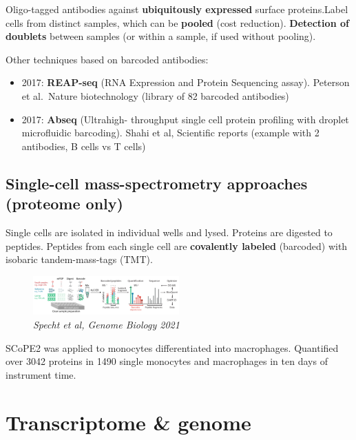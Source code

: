 Oligo-tagged antibodies against \textbf{ubiquitously expressed} surface
proteins.Label cells from distinct samples, which can be \textbf{pooled}
(cost reduction). \textbf{Detection of doublets} between samples (or
within a sample, if used without pooling).

Other techniques based on barcoded antibodies:

\begin{itemize}
\tightlist
\item
  2017: \textbf{REAP-seq} (RNA Expression and Protein Sequencing assay).
  Peterson et al.~Nature biotechnology (library of 82 barcoded
  antibodies)
\item
  2017: \textbf{Abseq} (Ultrahigh- throughput single cell protein
  profiling with droplet microfluidic barcoding). Shahi et al,
  Scientific reports (example with 2 antibodies, B cells vs T cells)
\end{itemize}

\hypertarget{single-cell-mass-spectrometry-approaches-proteome-only}{%
\subsection{Single-cell mass-spectrometry approaches (proteome
only)}\label{single-cell-mass-spectrometry-approaches-proteome-only}}

Single cells are isolated in individual wells and lysed. Proteins
are digested to peptides. Peptides from each single cell are
\textbf{covalently labeled} (barcoded) with isobaric tandem-mass-tags
(TMT).

\begin{figure}
\centering
\includegraphics[width=0.5\textwidth]{images/Screenshot_1.png}
\caption{\emph{Specht et al, Genome Biology 2021}}
\end{figure}


SCoPE2 was applied to monocytes differentiated into macrophages.
Quantified over 3042 proteins in 1490 single monocytes and macrophages
in ten days of instrument time.

\hypertarget{transcriptome-genome}{%
\section{Transcriptome \& genome}\label{transcriptome-genome}}

